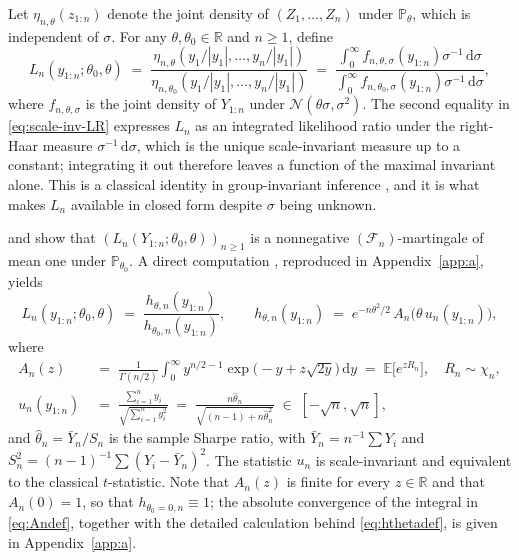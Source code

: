 \documentclass[numsec,webpdf,modern,medium,namedate]{oup-authoring-template}
\theoremstyle{thmstyleone}%
\theoremstyle{thmstyletwo}%
\theoremstyle{thmstylethree}%
\newcommand{\E}{\mathbb{E}}
\newcommand{\Prob}{\mathbb{P}}
\newcommand{\dd}{\,\mathrm{d}}
\newcommand{\1}{\mathbf{1}}
\begin{document}
Let \(\eta_{n,\theta}(z_{1:n})\) denote the joint density of \((Z_1,\ldots,Z_n)\) under \(\Prob_\theta\), which is independent of \(\sigma\). For any \(\theta,\theta_0\in\mathbb{R}\) and \(n\geq 1\), define
\begin{equation}\label{eq:scale-inv-LR}
  L_n(y_{1:n};\theta_0,\theta)
  \;=\;\frac{\eta_{n,\theta}(y_1/|y_1|,\ldots,y_n/|y_1|)}
            {\eta_{n,\theta_0}(y_1/|y_1|,\ldots,y_n/|y_1|)}
  \;=\;\frac{\int_0^\infty f_{n,\theta,\sigma}(y_{1:n})\sigma^{-1}\dd\sigma}
            {\int_0^\infty f_{n,\theta_0,\sigma}(y_{1:n})\sigma^{-1}\dd\sigma},
\end{equation}
where \(f_{n,\theta,\sigma}\) is the joint density of \(Y_{1:n}\) under \(\mathcal N(\theta\sigma,\sigma^2)\). The second equality in \eqref{eq:scale-inv-LR} expresses \(L_n\) as an integrated likelihood ratio under the right-Haar measure \(\sigma^{-1}\dd\sigma\), which is the unique scale-invariant measure up to a constant; integrating it out therefore leaves a function of the maximal invariant alone. This is a classical identity in group-invariant inference \citep{eaton1989group, lehmann2005testing}, and it is what makes \(L_n\) available in closed form despite \(\sigma\) being unknown.


\cite{Wang2025} and \cite{PerezOrtiz2024} show that \((L_n(Y_{1:n};\theta_0,\theta))_{n\geq 1}\) is a nonnegative \((\mathcal F_n)\)-martingale of mean one under \(\Prob_{\theta_0}\). A direct computation \citep[Sec.~4.4]{Wang2025}, reproduced in Appendix~\ref{app:a}, yields
\begin{equation}\label{eq:hthetadef}
  L_n(y_{1:n};\theta_0,\theta)
  \;=\;\frac{h_{\theta,n}(y_{1:n})}{h_{\theta_0,n}(y_{1:n})},
  \qquad
  h_{\theta,n}(y_{1:n}) \;=\; e^{-n\theta^2/2}\,A_n\bigl(\theta\,u_n(y_{1:n})\bigr),
\end{equation}
where
\begin{align}
  A_n(z) &\;=\;\frac{1}{\Gamma(n/2)}\int_0^\infty y^{n/2-1}
                \exp\!\bigl(-y+z\sqrt{2y}\bigr)\dd y
              \;=\; \E\bigl[e^{z R_n}\bigr],\quad R_n\sim\chi_n,
              \label{eq:Andef}\\[2pt]
  u_n(y_{1:n})
       &\;=\;\frac{\sum_{i=1}^n y_i}{\sqrt{\sum_{i=1}^n y_i^2}}
       \;=\;\frac{n\widehat\theta_n}{\sqrt{(n-1)+n\widehat\theta_n^2}}
       \;\in\;[-\sqrt n,\sqrt n],
       \label{eq:undef}
\end{align}
and \(\widehat\theta_n=\bar Y_n/S_n\) is the sample Sharpe ratio, with \(\bar Y_n=n^{-1}\sum Y_i\) and \(S_n^2=(n-1)^{-1}\sum(Y_i-\bar Y_n)^2\). The statistic \(u_n\) is scale-invariant and equivalent to the classical \(t\)-statistic. Note that $A_n(z)$ is finite for every $z\in\mathbb{R}$ and that $A_n(0)=1$, so that $h_{\theta_0=0,n}\equiv 1$; the absolute convergence of the integral in \eqref{eq:Andef}, together with the detailed calculation behind \eqref{eq:hthetadef}, is given in Appendix~\ref{app:a}.
\end{document}
